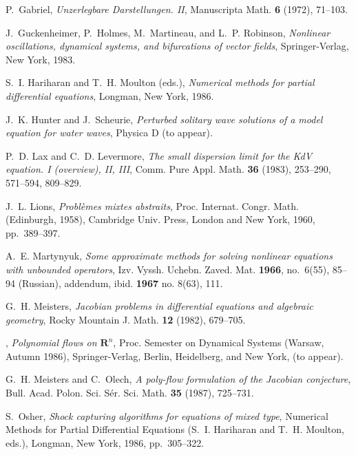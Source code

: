 \documentclass[12pt]{article}
\begin{document}
\begin{thebibliography}{10}
P.~Gabriel,
 {\em Unzerlegbare {D}arstellungen. {\rm II}},
 Manuscripta Math.  {\bf 6} (1972), 71--103.

J.~Guckenheimer, P.~Holmes, M.~Martineau, and L.~P. Robinson,
 {\em Nonlinear  oscillations, dynamical systems,
 and bifurcations of vector fields},
  Springer-Verlag, New York, 1983.

S.~I. Hariharan and T.~H. Moulton (eds.),
 {\em Numerical methods for partial differential equations},
 Longman, New York, 1986.

J.~K. Hunter and J.~Scheurie,
 {\em Perturbed solitary wave solutions of a model
  equation for water waves},
 Physica D (to appear).

P.~D. Lax and C.~D. Levermore,
 {\em The small dispersion limit for the {KdV}
  equation. {\rm I (overview)}, {\rm II}, {\rm III}},
 Comm. Pure Appl. Math.
  {\bf 36} (1983), 253--290, 571--594, 809--829.

J.~L. Lions,
 {\em Probl\`emes mixtes abstraits},
 Proc. Internat. Congr. Math.  (Edinburgh, 1958),
 Cambridge Univ. Press, London and New York, 1960,
  pp.~389--397.

A.~E. Martynyuk,
 {\em Some approximate methods for solving nonlinear equations
  with unbounded operators},
 Izv. Vyssh. Uchebn. Zaved. Mat. {\bf 1966},
  no.~6(55), 85--94 (Russian),
 addendum, ibid. {\bf 1967} no. 8(63), 111.



G.~H. Meisters,
 {\em Jacobian problems in differential equations and algebraic
  geometry}, Rocky Mountain J. Math. {\bf 12} (1982), 679--705.

\bysame, 
{\em Polynomial flows on {${\mathbf R}^n$}},
 Proc. Semester on Dynamical
  Systems (Warsaw, Autumn 1986),
 Springer-Verlag, Berlin, Heidelberg, and New York, (to appear).



G.~H. Meisters and C.~Olech,
 {\em A poly-flow formulation of the {J}acobian  conjecture},
 Bull. Acad. Polon. Sci. S\'er. Sci. Math. {\bf 35} (1987),
  725--731.

S.~Osher,
 {\em Shock capturing algorithms for equations of mixed type},
  Numerical Methods for Partial Differential Equations 
(S.~I. Hariharan and  T.~H. Moulton, eds.),
 Longman, New York, 1986, pp.~305--322.


\end{thebibliography}
\end{document}
